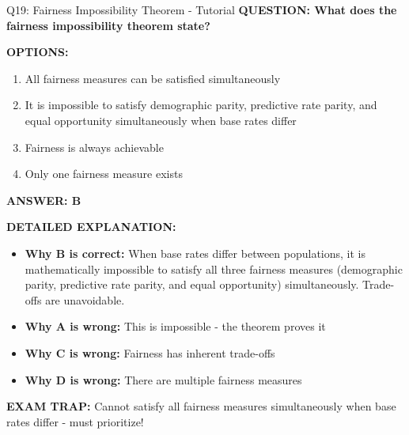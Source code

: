 \documentclass[8pt]{beamer}
\begin{document}
	\begin{frame}{Q19: Fairness Impossibility Theorem - Tutorial}
		\fontsize{6.5}{7.5}\selectfont
		\textbf{QUESTION: What does the fairness impossibility theorem state?}
		
		\vspace{0.1cm}
		\textbf{OPTIONS:}
		\begin{enumerate}
			\item All fairness measures can be satisfied simultaneously
			\item It is impossible to satisfy demographic parity, predictive rate parity, and equal opportunity simultaneously when base rates differ
			\item Fairness is always achievable
			\item Only one fairness measure exists
		\end{enumerate}
		
		\vspace{0.1cm}
		\textcolor{myblue}{\textbf{ANSWER: B}}
		
		\vspace{0.1cm}
		\textbf{DETAILED EXPLANATION:}
		\begin{itemize}
			\item \textbf{Why B is correct:} When base rates differ between populations, it is mathematically impossible to satisfy all three fairness measures (demographic parity, predictive rate parity, and equal opportunity) simultaneously. Trade-offs are unavoidable.
			\item \textbf{Why A is wrong:} This is impossible - the theorem proves it
			\item \textbf{Why C is wrong:} Fairness has inherent trade-offs
			\item \textbf{Why D is wrong:} There are multiple fairness measures
		\end{itemize}
		
		\textcolor{myred}{\textbf{EXAM TRAP:}} Cannot satisfy \textcolor{myblue}{all fairness measures} simultaneously when base rates differ - must prioritize!
	\end{frame}
	
\end{document}
